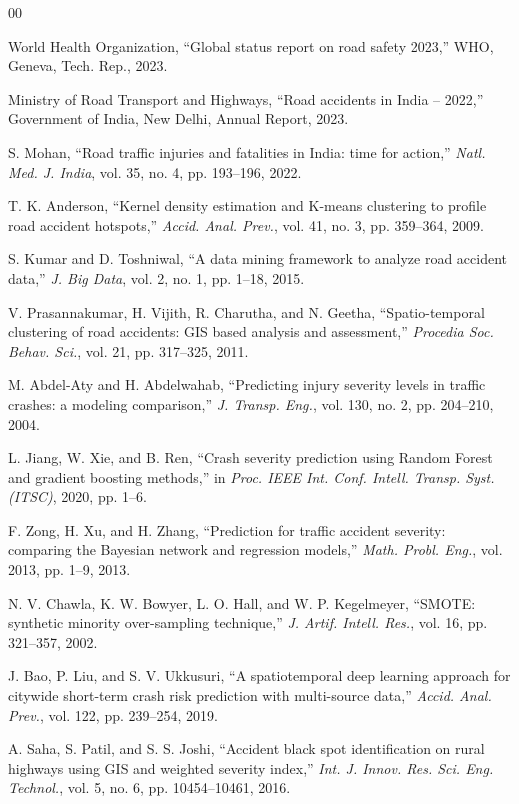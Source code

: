\documentclass[conference]{IEEEtran}
\begin{document}
\begin{thebibliography}{00}

 World Health Organization, ``Global status report on road safety 2023,'' WHO, Geneva, Tech. Rep., 2023.

 Ministry of Road Transport and Highways, ``Road accidents in India -- 2022,'' Government of India, New Delhi, Annual Report, 2023.

 S. Mohan, ``Road traffic injuries and fatalities in India: time for action,'' \textit{Natl. Med. J. India}, vol. 35, no. 4, pp. 193--196, 2022.

 T. K. Anderson, ``Kernel density estimation and K-means clustering to profile road accident hotspots,'' \textit{Accid. Anal. Prev.}, vol. 41, no. 3, pp. 359--364, 2009.

 S. Kumar and D. Toshniwal, ``A data mining framework to analyze road accident data,'' \textit{J. Big Data}, vol. 2, no. 1, pp. 1--18, 2015.

 V. Prasannakumar, H. Vijith, R. Charutha, and N. Geetha, ``Spatio-temporal clustering of road accidents: GIS based analysis and assessment,'' \textit{Procedia Soc. Behav. Sci.}, vol. 21, pp. 317--325, 2011.

 M. Abdel-Aty and H. Abdelwahab, ``Predicting injury severity levels in traffic crashes: a modeling comparison,'' \textit{J. Transp. Eng.}, vol. 130, no. 2, pp. 204--210, 2004.

 L. Jiang, W. Xie, and B. Ren, ``Crash severity prediction using Random Forest and gradient boosting methods,'' in \textit{Proc. IEEE Int. Conf. Intell. Transp. Syst. (ITSC)}, 2020, pp. 1--6.

 F. Zong, H. Xu, and H. Zhang, ``Prediction for traffic accident severity: comparing the Bayesian network and regression models,'' \textit{Math. Probl. Eng.}, vol. 2013, pp. 1--9, 2013.

 N. V. Chawla, K. W. Bowyer, L. O. Hall, and W. P. Kegelmeyer, ``SMOTE: synthetic minority over-sampling technique,'' \textit{J. Artif. Intell. Res.}, vol. 16, pp. 321--357, 2002.

 J. Bao, P. Liu, and S. V. Ukkusuri, ``A spatiotemporal deep learning approach for citywide short-term crash risk prediction with multi-source data,'' \textit{Accid. Anal. Prev.}, vol. 122, pp. 239--254, 2019.

 A. Saha, S. Patil, and S. S. Joshi, ``Accident black spot identification on rural highways using GIS and weighted severity index,'' \textit{Int. J. Innov. Res. Sci. Eng. Technol.}, vol. 5, no. 6, pp. 10454--10461, 2016.


\end{thebibliography}
\end{document}
